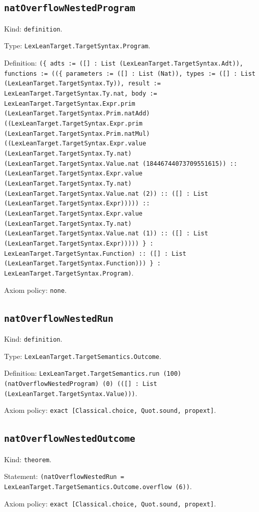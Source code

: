 \documentclass[11pt]{article}
\begin{document}
\subsection*{\texttt{natOverflowNestedProgram}}
\noindent Kind: \texttt{definition}.\par
\noindent Type: \texttt{LexLeanTarget.TargetSyntax.Program}.\par
\noindent Definition: \texttt{(\{ adts := ([] : List (LexLeanTarget.TargetSyntax.Adt)), functions := ((\{ parameters := ([] : List (Nat)), types := ([] : List (LexLeanTarget.TargetSyntax.Ty)), result := LexLeanTarget.TargetSyntax.Ty.nat, body := LexLeanTarget.TargetSyntax.Expr.prim (LexLeanTarget.TargetSyntax.Prim.natAdd) ((LexLeanTarget.TargetSyntax.Expr.prim (LexLeanTarget.TargetSyntax.Prim.natMul) ((LexLeanTarget.TargetSyntax.Expr.value (LexLeanTarget.TargetSyntax.Ty.nat) (LexLeanTarget.TargetSyntax.Value.nat (18446744073709551615)) :: (LexLeanTarget.TargetSyntax.Expr.value (LexLeanTarget.TargetSyntax.Ty.nat) (LexLeanTarget.TargetSyntax.Value.nat (2)) :: ([] : List (LexLeanTarget.TargetSyntax.Expr))))) :: (LexLeanTarget.TargetSyntax.Expr.value (LexLeanTarget.TargetSyntax.Ty.nat) (LexLeanTarget.TargetSyntax.Value.nat (1)) :: ([] : List (LexLeanTarget.TargetSyntax.Expr))))) \} : LexLeanTarget.TargetSyntax.Function) :: ([] : List (LexLeanTarget.TargetSyntax.Function))) \} : LexLeanTarget.TargetSyntax.Program)}.\par
\noindent Axiom policy: \texttt{none}.\par
\subsection*{\texttt{natOverflowNestedRun}}
\noindent Kind: \texttt{definition}.\par
\noindent Type: \texttt{LexLeanTarget.TargetSemantics.Outcome}.\par
\noindent Definition: \texttt{LexLeanTarget.TargetSemantics.run (100) (natOverflowNestedProgram) (0) (([] : List (LexLeanTarget.TargetSyntax.Value)))}.\par
\noindent Axiom policy: \texttt{exact [Classical.choice, Quot.sound, propext]}.\par
\subsection*{\texttt{natOverflowNestedOutcome}}
\noindent Kind: \texttt{theorem}.\par
\noindent Statement: \texttt{(natOverflowNestedRun = LexLeanTarget.TargetSemantics.Outcome.overflow (6))}.\par
\noindent Axiom policy: \texttt{exact [Classical.choice, Quot.sound, propext]}.\par
\end{document}
